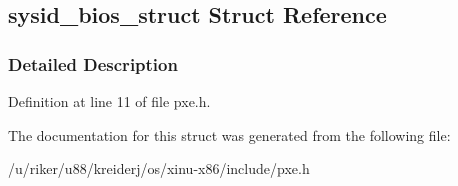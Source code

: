 \hypertarget{structsysid__bios__struct}{}\subsection{sysid\+\_\+bios\+\_\+struct Struct Reference}
\label{structsysid__bios__struct}


\subsubsection{Detailed Description}


Definition at line 11 of file pxe.\+h.



The documentation for this struct was generated from the following file\+:\begin{DoxyCompactItemize}
\item 
/u/riker/u88/kreiderj/os/xinu-\/x86/include/pxe.\+h\end{DoxyCompactItemize}
